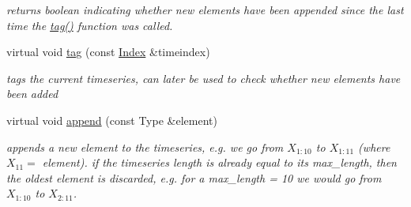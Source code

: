 \begin{DoxyCompactItemize}
\begin{DoxyCompactList}\small\item\em returns boolean indicating whether new elements have been appended since the last time the \hyperlink{classreal__time__tools_1_1ThreadsafeTimeseries_a07a775400d1b9446bded449ad953a8d9}{tag()} function was called. \end{DoxyCompactList}\item 
virtual void \hyperlink{classreal__time__tools_1_1ThreadsafeTimeseries_a07a775400d1b9446bded449ad953a8d9}{tag} (const \hyperlink{classreal__time__tools_1_1ThreadsafeTimeseries_a9364696c534468d7ad927883b16ca981}{Index} \&timeindex)\hypertarget{classreal__time__tools_1_1ThreadsafeTimeseries_a07a775400d1b9446bded449ad953a8d9}{}\label{classreal__time__tools_1_1ThreadsafeTimeseries_a07a775400d1b9446bded449ad953a8d9}

\begin{DoxyCompactList}\small\item\em tags the current timeseries, can later be used to check whether new elements have been added \end{DoxyCompactList}\item 
virtual void \hyperlink{classreal__time__tools_1_1ThreadsafeTimeseries_ae0a782bf3b1a483647d5d342a994335c}{append} (const Type \&element)\hypertarget{classreal__time__tools_1_1ThreadsafeTimeseries_ae0a782bf3b1a483647d5d342a994335c}{}\label{classreal__time__tools_1_1ThreadsafeTimeseries_ae0a782bf3b1a483647d5d342a994335c}

\begin{DoxyCompactList}\small\item\em appends a new element to the timeseries, e.\+g. we go from $ X_{1:10} $ to $ X_{1:11} $ (where $ X_{11}=$ element). if the timeseries length is already equal to its max\+\_\+length, then the oldest element is discarded, e.\+g. for a max\+\_\+length = 10 we would go from $ X_{1:10} $ to $ X_{2:11} $. \end{DoxyCompactList}\end{DoxyCompactItemize}

